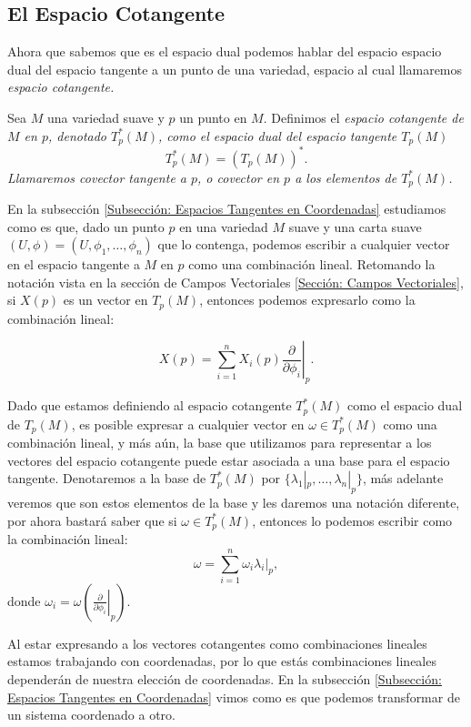 \subsection{El Espacio Cotangente}\label{Subsección: El Espacio Cotangente}
Ahora que sabemos que es el espacio dual podemos hablar del espacio espacio dual del espacio tangente a un punto de una variedad, espacio al cual llamaremos \it{espacio cotangente}.

\begin{definition}
	Sea $M$ una variedad suave y $p$ un punto en $M$. Definimos el \it{espacio cotangente de $M$ en $p$}, denotado $T_{p}^{*}(M)$, como el espacio dual del espacio tangente $T_p(M)$
	\[
		T^{*}_p(M) = (T_p(M))^*.
	\]
	Llamaremos \textit{covector tangente a $p$}, o \textit{covector en $p$} a los elementos de $T_p^{*}(M)$.
\end{definition}

En la subsección \ref{Subsección: Espacios Tangentes en Coordenadas} estudiamos como es que, dado un punto $p$ en una variedad $M$ suave y una carta suave $(U,\phi) = (U,\phi_1,\ldots,\phi_n)$ que lo contenga, podemos escribir a cualquier vector en el espacio tangente a $M$ en $p$ como una combinación lineal. Retomando la notación vista en la sección de Campos Vectoriales \ref{Sección: Campos Vectoriales}, si $X(p)$ es un vector en $T_p(M)$, entonces podemos expresarlo como la combinación lineal:

\[
	X(p) = \sum_{i=1}^{n} X_i(p) \left. \frac{\partial}{\partial \phi_i} \right|_{p}.
\]

Dado que estamos definiendo al espacio cotangente $T_{p}^{*}(M)$ como el espacio dual de $T_p(M)$, es posible expresar a cualquier vector en $\omega \in T_{p}^{*}(M)$ como una combinación lineal, y más aún, la base que utilizamos para representar a los vectores del espacio cotangente puede estar asociada a una base para el espacio tangente. Denotaremos a la base de $T_{p}^{*}(M)$ por $\{\lambda_1|_p, \ldots, \lambda_n|_p\}$, más adelante veremos que son estos elementos de la base y les daremos una notación diferente, por ahora bastará saber que si $\omega \in T_{p}^{*}(M)$, entonces lo podemos escribir como la combinación lineal:
\[
	\omega = \sum_{i=1}^{n} \omega_i \left. \lambda_i \right|_p,
\]
donde $\omega_i = \omega \left( \left. \frac{\partial}{\partial \phi_i} \right|_p\right)$.

Al estar expresando a los vectores cotangentes como combinaciones lineales estamos trabajando con coordenadas, por lo que estás combinaciones lineales dependerán de nuestra elección de coordenadas. En la subsección \ref{Subsección: Espacios Tangentes en Coordenadas} vimos como es que podemos transformar de un sistema coordenado a otro.

